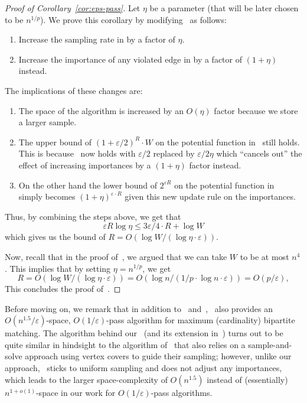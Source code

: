 \documentclass{article}
\renewcommand{\leq}{\leqslant}
\newcommand{\eps}{\varepsilon}
\begin{document}
\begin{proof}[Proof of Corollary~\ref{cor:eps-pass}]
Let $\eta$ be a parameter (that will be later chosen to be $n^{1/p}$). We prove this corollary by modifying~ as follows: 
\begin{enumerate}
	\item Increase the sampling rate in  by a factor of $\eta$. 
	\item Increase the importance of any violated edge in  by a factor of $(1+\eta)$ instead. 
\end{enumerate}
The implications of these changes are: 
\begin{enumerate}
	\item The space of the algorithm is increased by an $O(\eta)$ factor because we store a larger sample. 
	\item The upper bound of $(1+\eps/2)^{R} \cdot W$ on the potential function in~ still holds. This is because~ now holds with $\eps/2$ replaced by $\eps/2\eta$ which
	``cancels out'' the effect of increasing importances by a $(1+\eta)$ factor instead. 
	
	\item On the other hand the lower bound of $2^{\eps R}$ on the potential function in~ simply becomes $(1+\eta)^{\eps \cdot R}$ 
	given this new update rule on the importances. 
\end{enumerate}
	 Thus, by combining the steps above, we get that 
	\[
		\eps R \log{\eta} \leq 3\eps/4 \cdot R + \log{W}
	\]
	which gives us the bound of $R=O(\log{W}/(\log{\eta} \cdot \eps))$. 

Now, recall that in the proof of~, we argued that we can take $W$ to be at most $n^{4}$. This implies that by setting $\eta = n^{1/p}$, we get 
\[
	R = O(\log{W}/(\log{\eta} \cdot \eps)) = O(\log{n}/(1/p \cdot \log{n} \cdot \eps)) = O(p/\eps), 
\]
This concludes the proof of~.
\end{proof}

Before moving on, we remark that in addition to~\cite{AhnG15} and~,~\cite{BehnezhadDETY17} also provides an $O(n^{1.5}/\eps)$-space, $O(1/\eps)$-pass algorithm for maximum (cardinality) bipartite matching.   
The algorithm behind our~ (and its extension in~) turns out to be quite similar in hindsight to the algorithm of~\cite{BehnezhadDETY17} that also relies on a sample-and-solve approach
using vertex covers to guide their sampling; however, unlike our approach,~\cite{BehnezhadDETY17} sticks to uniform sampling and does not adjust any importances, which leads to the larger space-complexity of $O(n^{1.5})$ instead 
of (essentially) $n^{1+o(1)}$-space in our work for $O(1/\eps)$-pass algorithms. 
\end{document}
